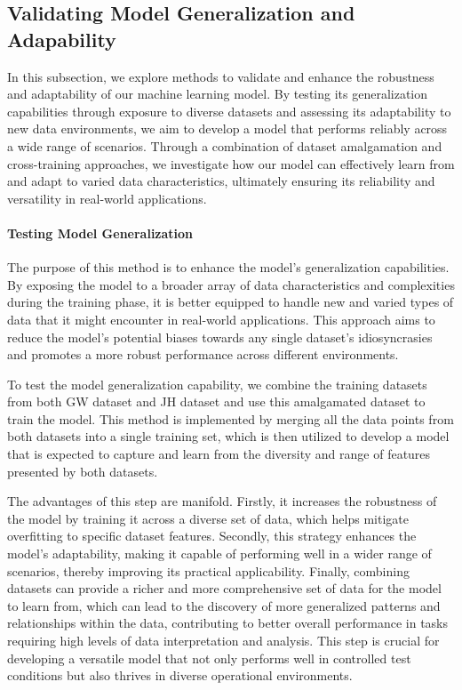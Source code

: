\subsection{Validating Model Generalization and Adapability}
\label{subsec:5_validating_model_generalization_capability}
In this subsection, we explore methods to validate and enhance the robustness and adaptability of our machine learning model. By testing its generalization capabilities through exposure to diverse datasets and assessing its adaptability to new data environments, we aim to develop a model that performs reliably across a wide range of scenarios. Through a combination of dataset amalgamation and cross-training approaches, we investigate how our model can effectively learn from and adapt to varied data characteristics, ultimately ensuring its reliability and versatility in real-world applications.

\paragraph*{Testing Model Generalization}
\label{par:4_testing_model_generalization}
The purpose of this method is to enhance the model's generalization capabilities. By exposing the model to a broader array of data characteristics and complexities during the training phase, it is better equipped to handle new and varied types of data that it might encounter in real-world applications. This approach aims to reduce the model's potential biases towards any single dataset's idiosyncrasies and promotes a more robust performance across different environments.

To test the model generalization capability, we combine the training datasets from both GW dataset and JH dataset and use this amalgamated dataset to train the model. This method is implemented by merging all the data points from both datasets into a single training set, which is then utilized to develop a model that is expected to capture and learn from the diversity and range of features presented by both datasets.

The advantages of this step are manifold. Firstly, it increases the robustness of the model by training it across a diverse set of data, which helps mitigate overfitting to specific dataset features. Secondly, this strategy enhances the model’s adaptability, making it capable of performing well in a wider range of scenarios, thereby improving its practical applicability. Finally, combining datasets can provide a richer and more comprehensive set of data for the model to learn from, which can lead to the discovery of more generalized patterns and relationships within the data, contributing to better overall performance in tasks requiring high levels of data interpretation and analysis. This step is crucial for developing a versatile model that not only performs well in controlled test conditions but also thrives in diverse operational environments.

